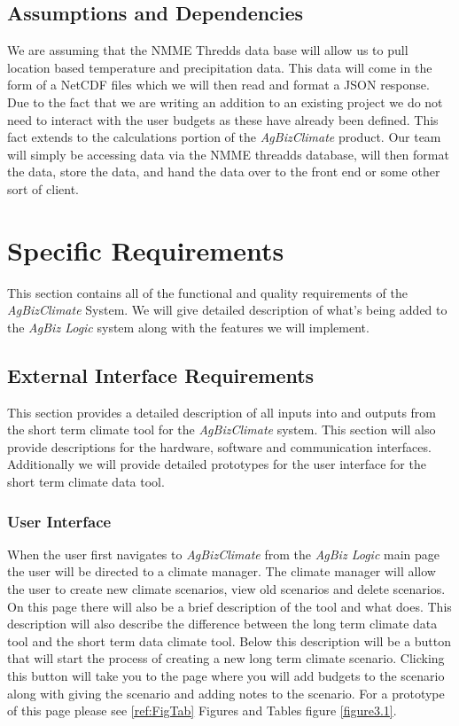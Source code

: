 \documentclass[onecolumn, draftclsnofoot,10pt, compsoc]{article}
\begin{document}
	\subsection {Assumptions and Dependencies}
		We are assuming that the NMME Thredds data base will allow us to pull location based temperature and precipitation data. This data will come in the form of a NetCDF files which we will then read and format a JSON response. Due to the fact that we are writing an addition to an existing project we do not need to interact with the user budgets as these have already been defined. This fact extends to the calculations portion of the \textit{AgBizClimate} product. Our team will simply be accessing data via the NMME threadds database, will then format the data, store the data, and hand the data over to the front end or some other sort of client.\\

\section{Specific Requirements}
This section contains all of the functional and quality requirements of the \textit{AgBizClimate} System. We will give detailed description of what's being added to the \textit{AgBiz Logic} system along with the features we will implement.\\
    \subsection{External Interface Requirements}
		This section provides a detailed description of all inputs into and outputs from the short term climate tool for the \textit{AgBizClimate} system. This section will also provide descriptions for the hardware, software and communication interfaces. Additionally we will provide detailed prototypes for the user interface for the short term climate data tool.\\
        \subsubsection{User Interface}
					When the user first navigates to \textit{AgBizClimate} from the \textit{AgBiz Logic} main page the user will be directed to a climate manager. The climate manager will allow the user to create new climate scenarios, view old scenarios and delete scenarios. On this page there will also be a brief description of the tool and what does. This description will also describe the difference between the long term climate data tool and the short term data climate tool. Below this description will be a button that will start the process of creating a new long term climate scenario. Clicking this button will take you to the page where you will add budgets to the scenario along with giving the scenario and adding notes to the scenario. For a prototype of this page please see \ref{ref:FigTab} Figures and Tables figure \ref{figure3.1}.\\
\end{document}
